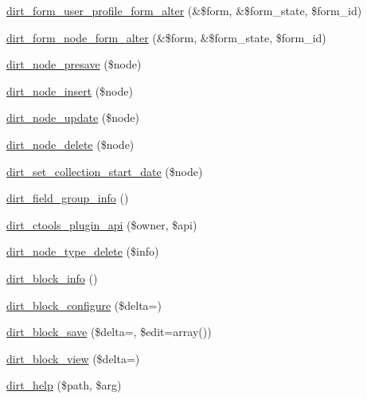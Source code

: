 \begin{DoxyCompactItemize}
\item 
\mbox{\hyperlink{dirt_8module_a715888e3e87edadd09f19b09f422fb34}{dirt\+\_\+form\+\_\+user\+\_\+profile\+\_\+form\+\_\+alter}} (\&\$form, \&\$form\+\_\+state, \$form\+\_\+id)
\item 
\mbox{\hyperlink{dirt_8module_aab2461d317b8f24bc997fe1b326341ce}{dirt\+\_\+form\+\_\+node\+\_\+form\+\_\+alter}} (\&\$form, \&\$form\+\_\+state, \$form\+\_\+id)
\item 
\mbox{\hyperlink{dirt_8module_acd5109622a8a086e52865d33c65663b2}{dirt\+\_\+node\+\_\+presave}} (\$node)
\item 
\mbox{\hyperlink{dirt_8module_ad28f2e8a3a8121a540d1e6842e477ee6}{dirt\+\_\+node\+\_\+insert}} (\$node)
\item 
\mbox{\hyperlink{dirt_8module_a609a95e86473e9f2e29edb68db424c50}{dirt\+\_\+node\+\_\+update}} (\$node)
\item 
\mbox{\hyperlink{dirt_8module_aca0048b06592f2773d243afb63888046}{dirt\+\_\+node\+\_\+delete}} (\$node)
\item 
\mbox{\hyperlink{dirt_8module_a532e08f64223e31e9ae63bd96be99b04}{dirt\+\_\+set\+\_\+collection\+\_\+start\+\_\+date}} (\$node)
\item 
\mbox{\hyperlink{dirt_8module_a97f8e96365a6daa59124719131a06620}{dirt\+\_\+field\+\_\+group\+\_\+info}} ()
\item 
\mbox{\hyperlink{dirt_8module_aac8181e5fc6a9a9b41e8030ea69ff309}{dirt\+\_\+ctools\+\_\+plugin\+\_\+api}} (\$owner, \$api)
\item 
\mbox{\hyperlink{dirt_8module_a6177c328a5d958a377e97fb2ed5aad44}{dirt\+\_\+node\+\_\+type\+\_\+delete}} (\$info)
\item 
\mbox{\hyperlink{dirt_8module_a9ed4b3ad1c933fda9cec72f061b6e760}{dirt\+\_\+block\+\_\+info}} ()
\item 
\mbox{\hyperlink{dirt_8module_ac28f8dfc219bc2641519b5a5751a20a6}{dirt\+\_\+block\+\_\+configure}} (\$delta=\textquotesingle{}\textquotesingle{})
\item 
\mbox{\hyperlink{dirt_8module_a6f85cfdd4a2150ae8e481da32b84e868}{dirt\+\_\+block\+\_\+save}} (\$delta=\textquotesingle{}\textquotesingle{}, \$edit=array())
\item 
\mbox{\hyperlink{dirt_8module_ad84fae63789a218f0524a194fd9caabe}{dirt\+\_\+block\+\_\+view}} (\$delta=\textquotesingle{}\textquotesingle{})
\item 
\mbox{\hyperlink{dirt_8module_aa608ad2ec0aa6732a3a4df4bb76d2e8f}{dirt\+\_\+help}} (\$path, \$arg)
\item 

\end{DoxyCompactItemize}
